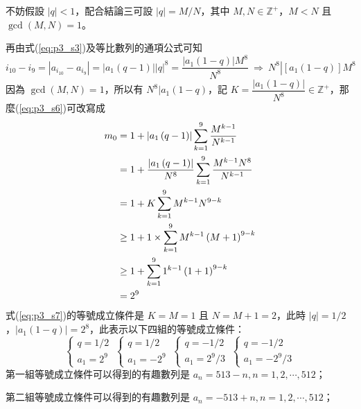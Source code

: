 不妨假設 $|q|<1$，配合結論三可設 $|q|=M/N$，其中 $M,N\in\mathbb{Z}^+$，$M<N$ 且 $\gcd\left(M,N\right)=1$。

再由式(\ref{eq:p3_s3})及等比數列的通項公式可知
\begin{equation}
  i_{10}-i_9=\left|a_{i_{10}}-a_{i_9}\right|=\left|a_1\left(q-1\right)\right|\left|q\right|^8=\frac{\left|a_1\left(1-q\right)\right|M^8}{N^8}\ \Rightarrow\ N^8\left|\left[a_1\left(1-q\right)\right]M^8\right.
\end{equation}
因為 $\gcd\left(M,N\right)=1$，所以有 $N^8|a_1\left(1-q\right)$，記 $K=\dfrac{\left|a_1\left(1-q\right)\right|}{N^8}\in\mathbb{Z}^+$，那麼(\ref{eq:p3_s6})可改寫成
\begin{align}
  m_0&=1+\left|a_1\left(q-1\right)\right|\sum_{k=1}^{9}{\frac{M^{k-1}}{N^{k-1}}}\notag\\
  &=1+\frac{\left|a_1\left(q-1\right)\right|}{N^8}\sum_{k=1}^{9}{\frac{M^{k-1}N^8}{N^{k-1}}}\notag\\
  &=1+K\sum_{k=1}^{9}{M^{k-1}N^{9-k}}\notag\\
  &\geq1+1\times\sum_{k=1}^{9}{M^{k-1}\left(M+1\right)^{9-k}}\notag\\
  &\geq1+\sum_{k=1}^{9}{1^{k-1}\left(1+1\right)^{9-k}}\notag\\
  &=2^9\label{eq:p3_s7}
\end{align}
式(\ref{eq:p3_s7})的等號成立條件是 $K=M=1$ 且 $N=M+1=2$，此時 $|q|=1/2$，$|a_1\left(1-q\right)|=2^8$，此表示以下四組的等號成立條件：
\begin{equation}
  \left\{\begin{matrix}
    q=1/2\\
    a_1=2^9
  \end{matrix}\right.\ 
  \left\{\begin{matrix}
    q=1/2\\
    a_1=-2^9
  \end{matrix}\right.\ 
  \left\{\begin{matrix}
    q=-1/2\\
    a_1=2^9/3
  \end{matrix}\right.\ 
  \left\{\begin{matrix}
    q=-1/2\\
    a_1=-2^9/3
  \end{matrix}\right.
\end{equation}
第一組等號成立條件可以得到的有趣數列是 $a_n=513-n, n=1,2,\cdots,512$；

第二組等號成立條件可以得到的有趣數列是 $a_n=-513+n, n=1,2,\cdots,512$；

